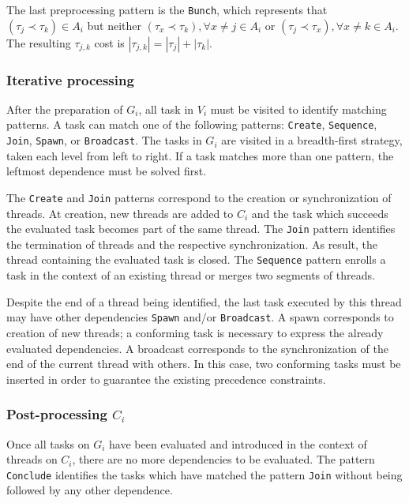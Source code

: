 \documentclass[twocolumn]{svjour3}
\begin{document}
The last preprocessing pattern is the \verb+Bunch+, which represents that $(\tau_j \prec \tau_k) \in A_i $ but neither $(\tau_x \prec \tau_k), \forall x \neq j \in A_i $ or  $(\tau_j \prec \tau_x), \forall x \neq k \in A_i $. The resulting $\tau_{j,k}$ cost is $|\tau_{j,k}| = |\tau_j| + |\tau_k|$.

\subsubsection{Iterative processing}

After the preparation of $G_i$, all task in $V_i$ must be visited to identify matching patterns. A task can match one of the following patterns: \verb+Create+, \verb+Sequence+, \verb+Join+, \verb+Spawn+, or \verb+Broadcast+. The tasks in $G_i$ are visited in a breadth-first strategy, taken each level from left to right. If a task matches more than one pattern, the leftmost dependence must be solved first.

The \verb+Create+ and \verb+Join+ patterns correspond to the creation or synchronization of threads. At creation, new threads are added to $C_i$ and the task which succeeds the evaluated task becomes part of the same thread. The \verb+Join+ pattern identifies the termination of threads and the respective synchronization. As result, the thread containing the evaluated task is closed. The \verb+Sequence+ pattern enrolls a task in the context of an existing thread or merges two segments of threads.

Despite the end of a thread being identified, the last task executed by this thread may have other {\color{blue}dependencies} \verb+Spawn+ and/or \verb+Broadcast+. A spawn corresponds to creation of new threads; a conforming task is necessary to express the already evaluated {\color{blue}dependencies}. A broadcast corresponds to the synchronization of the end of the current thread with others. In this case, two conforming tasks must be inserted in order to guarantee the existing precedence constraints.

\subsubsection{Post-processing $C_i$}

Once all tasks on $G_i$ have been evaluated and introduced in the context of threads on $C_i$, there are no more {\color{blue}dependencies} to be evaluated. The pattern \verb+Conclude+ identifies the tasks which have matched the pattern \verb+Join+ without being followed by any other dependence.
\end{document}
